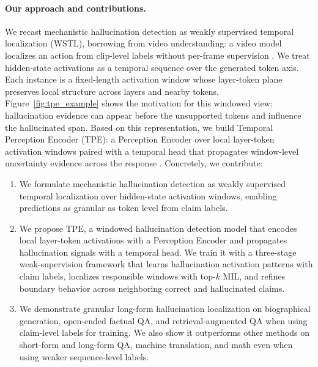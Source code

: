 \paragraph{Our approach and contributions.}
We recast mechanistic hallucination detection as weakly supervised temporal
localization (WSTL), borrowing from video understanding: a video model localizes
an action from clip-level labels without per-frame supervision
\citep{pilhyeonlee2021}. We treat hidden-state activations as a temporal sequence
over the generated token axis. Each instance is a fixed-length activation window
whose layer-token plane preserves local structure across layers and nearby
tokens. Figure~\ref{fig:tpe_example} shows the motivation for this windowed view:
hallucination evidence can appear before the unsupported tokens and influence
the hallucinated span. Based on this representation, we build Temporal Perception
Encoder (TPE): a Perception Encoder over local layer-token activation windows
paired with a temporal head that propagates window-level uncertainty evidence
across the response \citep{bolya2025perceptionencoder,albertgu2024}. Concretely,
we contribute:
\begin{enumerate}
    \item We formulate mechanistic hallucination detection as weakly supervised
    temporal localization over hidden-state activation windows, enabling predictions
    as granular as token level from claim labels.

    \item We propose TPE, a windowed hallucination detection model that encodes local
    layer-token activations with a Perception Encoder and propagates hallucination signals with
    a temporal head. We train it with a three-stage weak-supervision framework that learns
    hallucination activation patterns with claim labels, localizes responsible windows with
    top-$k$ MIL, and refines boundary behavior across neighboring correct and
    hallucinated claims.

    \item We demonstrate granular long-form hallucination localization on
    biographical generation, open-ended factual QA, and retrieval-augmented QA
    when using claim-level labels for training. 
    We also show it outperforms other methods on short-form and long-form QA, machine translation, and math
    even when using weaker sequence-level labels.
\end{enumerate}
